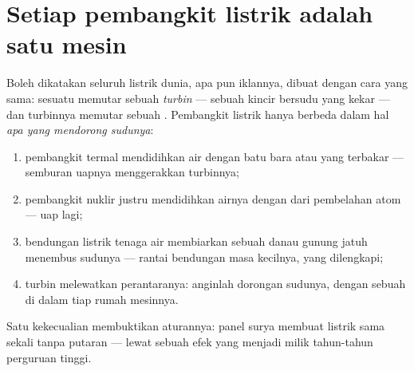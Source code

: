 \section{Setiap pembangkit listrik adalah satu mesin}

\begin{proposition}\label{prop:g9:alternator:core}
Boleh dikatakan seluruh listrik dunia, apa pun iklannya, dibuat dengan
cara yang sama: sesuatu memutar sebuah \emph{turbin} --- sebuah kincir
 bersudu yang kekar --- dan turbinnya memutar sebuah .
Pembangkit listrik hanya berbeda dalam hal \emph{apa yang mendorong
sudunya}:
\begin{enumerate}
  \item pembangkit termal mendidihkan air dengan batu bara atau 
        yang terbakar --- semburan uapnya menggerakkan turbinnya;
  \item pembangkit nuklir justru mendidihkan airnya dengan  dari
        pembelahan atom --- uap lagi;
  \item bendungan listrik tenaga air membiarkan sebuah danau gunung
        jatuh menembus sudunya --- rantai bendungan masa kecilnya,
        yang dilengkapi;
  \item turbin  melewatkan perantaranya: anginlah dorongan
        sudunya, dengan sebuah  di dalam tiap rumah
        mesinnya.
\end{enumerate}
Satu kekecualian membuktikan aturannya: panel surya membuat listrik
sama sekali tanpa putaran --- lewat sebuah efek  yang menjadi
milik tahun-tahun perguruan tinggi.
\end{proposition}

